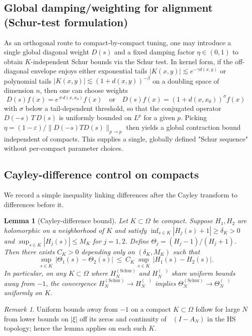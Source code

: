 \documentclass[11pt]{article}
\newtheorem{lemma}[theorem]{Lemma}
\theoremstyle{definition}
\theoremstyle{remark}
\newtheorem{remark}[theorem]{Remark}
\DeclareMathOperator{\dettwo}{det_2}
\begin{document}
\subsection{Global damping/weighting for alignment (Schur-test formulation)}\label{subsec:global-damping}
As an orthogonal route to compact-by-compact tuning, one may introduce a single global diagonal weight \(D(s)\) and a fixed damping factor \(\eta\in(0,1)\) to obtain \(K\)-independent Schur bounds via the Schur test. In kernel form, if the off-diagonal envelope enjoys either exponential tails \(|K(x,y)|\lesssim e^{-\gamma d(x,y)}\) or polynomial tails \(|K(x,y)|\lesssim (1+d(x,y))^{-\beta}\) on a doubling space of dimension \(n\), then one can choose weights
\[
 D(s)f(x)=e^{\,\sigma\,d(x,x_0)}f(x)\quad\text{or}\quad D(s)f(x)=(1+d(x,x_0))^{\sigma} f(x)
\]
with \(\sigma\) below a tail-dependent threshold, so that the conjugated operator \(D(-s)\,T\,D(s)\) is uniformly bounded on \(L^p\) for a given \(p\). Picking \(\eta=(1-\varepsilon)/\|D(-s)TD(s)\|_{p\to p}\) then yields a global contraction bound independent of compacts. This supplies a single, globally defined "Schur sequence" without per-compact parameter choices.

\subsection{Cayley-difference control on compacts}\label{subsec:Cayley-difference}
We record a simple inequality linking differences after the Cayley transform to differences before it.

\begin{lemma}[Cayley-difference bound]\label{lem:Cayley-diff}
Let \(K\subset\Omega\) be compact. Suppose \(H_1,H_2\) are holomorphic on a neighborhood of \(K\) and satisfy \(\inf_{s\in K}|H_j(s)+1|\ge \delta_K>0\) and \(\sup_{s\in K}|H_j(s)|\le M_K\) for \(j=1,2\). Define \(\Theta_j=(H_j-1)/(H_j+1)\). Then there exists \(C_K>0\) depending only on \((\delta_K,M_K)\) such that
\[
 \sup_{s\in K}\,\big|\Theta_1(s)-\Theta_2(s)\big|\ \le\ C_K\,\sup_{s\in K}\,\big|H_1(s)-H_2(s)\big|.
\]
In particular, on any \(K\subset\Omega\) where \(H_N^{(\mathrm{Schur})}\) and \(H_N^{(\dettwo)}\) share uniform bounds away from \(-1\), the convergence \(H_N^{(\mathrm{Schur})}\to H_N^{(\dettwo)}\) implies \(\Theta_N^{(\mathrm{Schur})}\to \Theta_N^{(\dettwo)}\) uniformly on \(K\).
\end{lemma}
\begin{remark}
Uniform bounds away from \(-1\) on a compact \(K\subset\Omega\) follow for large \(N\) from lower bounds on \(|\xi|\) off its zeros and continuity of \(\dettwo(I-A_N)\) in the HS topology; hence the lemma applies on each such \(K\).
\end{remark}
\end{document}
